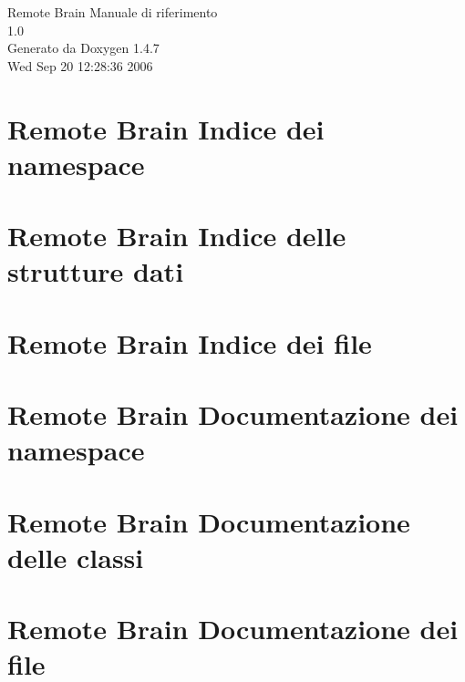 \documentclass[a4paper]{book}
\begin{document}
\begin{titlepage}
\vspace*{7cm}
\begin{center}
{\Large Remote Brain Manuale di riferimento\\[1ex]\large 1.0 }\\
\vspace*{1cm}
{\large Generato da Doxygen 1.4.7}\\
\vspace*{0.5cm}
{\small Wed Sep 20 12:28:36 2006}\\
\end{center}
\end{titlepage}
\clearemptydoublepage
{}
\tableofcontents
\clearemptydoublepage
{}
\chapter{Remote Brain Indice dei namespace}

\chapter{Remote Brain Indice delle strutture dati}

\chapter{Remote Brain Indice dei file}

\chapter{Remote Brain Documentazione dei namespace}

\chapter{Remote Brain Documentazione delle classi}


\chapter{Remote Brain Documentazione dei file}





\printindex
\end{document}
